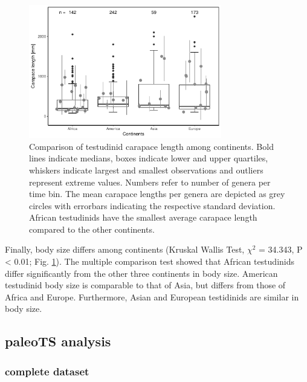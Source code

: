 \begin{figure}[htbp]
	\centering
	\includegraphics[width=0.75\textwidth]{MA_JJ_files/figure-latex/BPCon-1.pdf}
	\caption[Comparison of carapace lengths amon continents.]{Comparison of testudinid carapace length among continents. Bold lines indicate medians, boxes indicate lower and upper quartiles, whiskers indicate largest and smallest observations and outliers represent extreme values. Numbers refer to number of genera per time bin. The mean carapace lengths per genera are depicted as grey circles with errorbars indicating the respective standard deviation. African testudinids have the smallest average carapace length compared to the other continents.}
	\label{fig:boxCon}
\end{figure}




Finally, body size differs among continents (Kruskal Wallis Test, $\chi^2$ = 34.343, P < 0.01; Fig. \ref{fig:boxCon}). The multiple comparison test showed that African testudinids differ significantly from the other three continents in body size. American testudinid body size is comparable to that of Asia, but differs from those of Africa and Europe. Furthermore, Asian and European testidinids are similar in body size. %



\FloatBarrier

\subsection{paleoTS analysis}\label{paleots-analysis}


\subsubsection{complete dataset}\label{all-continental-and-insular}

